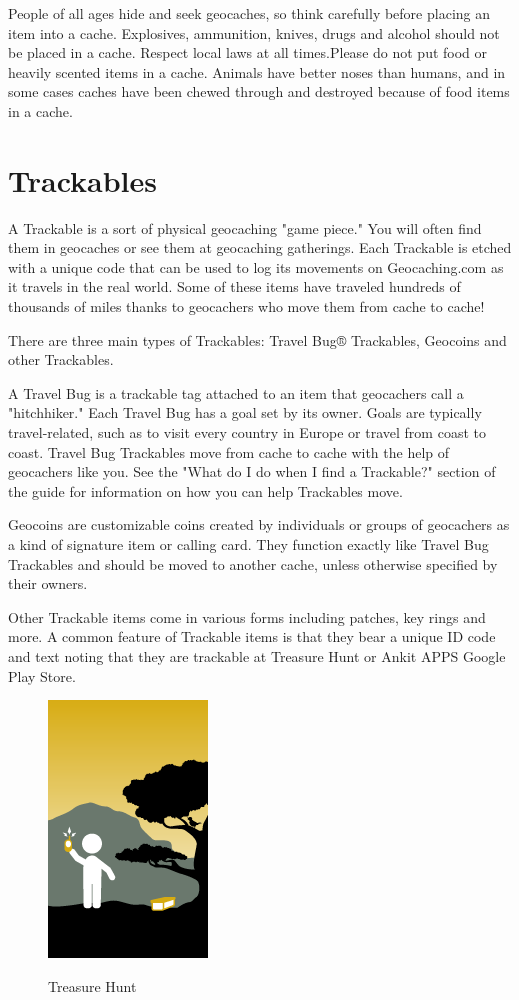 People of all ages hide and seek geocaches, so think carefully before placing an item into a cache. Explosives, ammunition, knives, drugs and alcohol should not be placed in a cache. Respect local laws at all times.Please do not put food or heavily scented items in a cache. Animals have better noses than humans, and in some cases caches have been chewed through and destroyed because of food items in a cache.




\section{Trackables}
A Trackable is a sort of physical geocaching "game piece." You will often find them in geocaches or see them at geocaching gatherings. Each Trackable is etched with a unique code that can be used to log its movements on Geocaching.com as it travels in the real world. Some of these items have traveled hundreds of thousands of miles thanks to geocachers who move them from cache to cache!

There are three main types of Trackables: Travel Bug® Trackables, Geocoins and other Trackables.

A Travel Bug is a trackable tag attached to an item that geocachers call a "hitchhiker." Each Travel Bug has a goal set by its owner. Goals are typically travel-related, such as to visit every country in Europe or travel from coast to coast. Travel Bug Trackables move from cache to cache with the help of geocachers like you. See the "What do I do when I find a Trackable?" section of the guide for information on how you can help Trackables move.

Geocoins are customizable coins created by individuals or groups of geocachers as a kind of signature item or calling card. They function exactly like Travel Bug Trackables and should be moved to another cache, unless otherwise specified by their owners.

Other Trackable items come in various forms including patches, key rings and more. A common feature of Trackable items is that they bear a unique ID code and text noting that they are trackable at Treasure Hunt or Ankit APPS Google Play Store.




\begin{figure} [ht]
\left
\includegraphics[scale=0.5]{cache}\\
\caption{Treasure Hunt }
\label{the-label-for-cross-referencing}
\end{figure}













